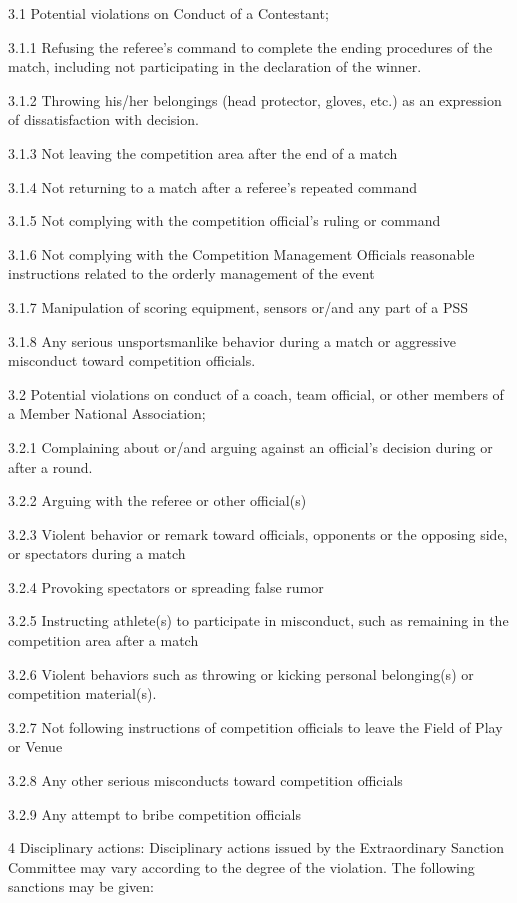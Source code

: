 \documentclass[draft]{report}
\begin{document}
3.1 Potential violations on Conduct of a Contestant;

3.1.1 Refusing the referee's command to complete the ending procedures
of the match, including not participating in the declaration of the
winner.

3.1.2 Throwing his/her belongings (head protector, gloves, etc.) as an
expression of dissatisfaction with decision.

3.1.3 Not leaving the competition area after the end of a match

3.1.4 Not returning to a match after a referee's repeated command

3.1.5 Not complying with the competition official's ruling or command

3.1.6 Not complying with the Competition Management Officials reasonable
instructions related to the orderly management of the event

3.1.7 Manipulation of scoring equipment, sensors or/and any part of a
PSS

3.1.8 Any serious unsportsmanlike behavior during a match or aggressive
misconduct toward competition officials.

3.2 Potential violations on conduct of a coach, team official, or other
members of a Member National Association;

3.2.1 Complaining about or/and arguing against an official's decision
during or after a round.

3.2.2 Arguing with the referee or other official(s)

3.2.3 Violent behavior or remark toward officials, opponents or the
opposing side, or spectators during a match

3.2.4 Provoking spectators or spreading false rumor

3.2.5 Instructing athlete(s) to participate in misconduct, such as
remaining in the competition area after a match

3.2.6 Violent behaviors such as throwing or kicking personal
belonging(s) or competition material(s).

3.2.7 Not following instructions of competition officials to leave the
Field of Play or Venue

3.2.8 Any other serious misconducts toward competition officials

3.2.9 Any attempt to bribe competition officials

4 Disciplinary actions: Disciplinary actions issued by the Extraordinary
Sanction Committee may vary according to the degree of the violation.
The following sanctions may be given:
\end{document}
